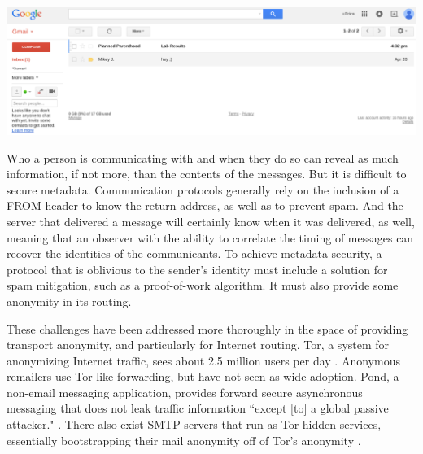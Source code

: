 \documentclass[pageno]{jpaper}
\begin{document}
\includegraphics[width=\textwidth]{planned}

Who a person is communicating with and when they do so can reveal as much information, if not more, than the contents of the messages. But it is difficult to secure metadata. Communication protocols generally rely on the inclusion of a FROM header to know the return address, as well as to prevent spam. And the server that delivered a message will certainly know when it was delivered, as well, meaning that an observer with the ability to correlate the timing of messages can recover the identities of the communicants. To achieve metadata-security, a protocol that is oblivious to the sender's identity must include a solution for spam mitigation, such as a proof-of-work algorithm. It must also provide some anonymity in its routing.

These challenges have been addressed more thoroughly in the space of providing transport anonymity, and particularly for Internet routing. Tor, a system for anonymizing Internet traffic, sees about 2.5 million users per day \cite{torusers}. Anonymous remailers use Tor-like forwarding, but have not seen as wide adoption. Pond, a non-email messaging application, provides forward secure asynchronous messaging that does not leak traffic information ``except [to] a global passive attacker." \cite{pond}. There also exist SMTP servers that run as Tor hidden services, essentially bootstrapping their mail anonymity off of Tor's anonymity \cite{onionmail}.
\end{document}
